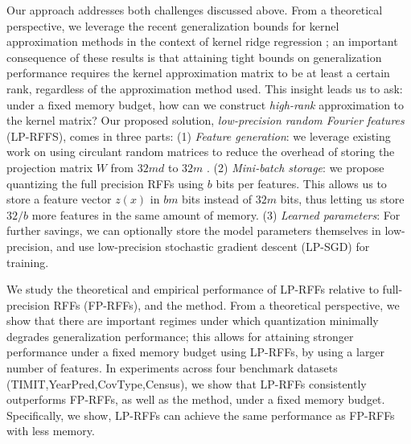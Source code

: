 Our approach addresses both challenges discussed above. From a theoretical perspective, we leverage the recent generalization bounds for kernel approximation methods in the context of kernel ridge regression \citep{avron17,musco17}; an important consequence of these results is that attaining tight bounds on generalization performance requires the kernel approximation matrix to be at least a certain rank, regardless of the approximation method used. This insight leads us to ask: under a fixed memory budget, how can we construct \textit{high-rank} approximation to the kernel matrix?  Our proposed solution, \textit{low-precision random Fourier features} (LP-RFFS), comes in three parts: (1)  \textit{Feature generation}: we leverage existing work on using circulant random matrices to reduce the overhead of storing the projection matrix $W$ from $32md$ to $32m$ \citep{yu15}. (2) \textit{Mini-batch storage}: we propose quantizing the full precision RFFs using $b$ bits per features. This allows us to store a feature vector $z(x)$ in $bm$ bits instead of $32m$ bits, thus letting us store $32/b$ more features in the same amount of memory. (3) \textit{Learned parameters}: For further savings, we can optionally store the model parameters themselves in low-precision, and use low-precision stochastic gradient descent (LP-SGD) for training.



We study the theoretical and empirical performance of LP-RFFs relative to full-precision RFFs (FP-RFFs), and the \Nystrom method.  From a theoretical perspective, we show that there are important regimes under which quantization minimally degrades generalization performance; this allows for attaining stronger performance under a fixed memory budget using LP-RFFs, by using a larger number of features. In experiments across four benchmark datasets (TIMIT,YearPred,CovType,Census), we show that LP-RFFs consistently outperforms FP-RFFs, as well as the \Nystrom method, under a fixed memory budget. Specifically, we show, LP-RFFs can achieve the same performance as FP-RFFs with  less memory.

